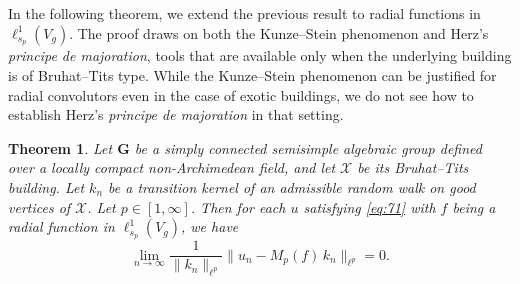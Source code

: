 \documentclass[11pt]{amsart}
\newcommand{\scrX}{\mathscr{X}}
\theoremstyle{plain}
\newcounter{thm}
\newtheorem{theorem}{Theorem}[section]
\theoremstyle{definition}
\numberwithin{equation}{section}
\begin{document}
In the following theorem, we extend the previous result to radial functions in $\ell^1_{s_p}(V_g)$. 
The proof draws on both the Kunze--Stein phenomenon and Herz’s \emph{principe de majoration}, tools that are available only 
when the underlying building is of Bruhat--Tits type. While the Kunze--Stein phenomenon can be justified for radial convolutors
even in the case of exotic buildings, we do not see how to establish Herz’s \emph{principe de majoration} in that setting.
\begin{theorem}
	\label{thm:9}
	Let $\mathbf{G}$ be a simply connected semisimple algebraic group defined over a locally compact non-Archimedean field,
	and let $\scrX$ be its Bruhat--Tits building. Let $k_n$ be a transition kernel of an admissible random walk on good vertices
	of $\scrX$. Let $p \in [1, \infty]$. Then for each $u$ satisfying \eqref{eq:71} with $f$ being a radial function
	in $\ell^1_{s_p}(V_g)$, we have
	\[
		\lim_{n \to \infty} 
		\frac{1}{\|k_n \|_{\ell^p}}
		\big\|u_n-M_p(f) \, k_n\|_{\ell^p} = 0.
	\]
\end{theorem}
\end{document}
